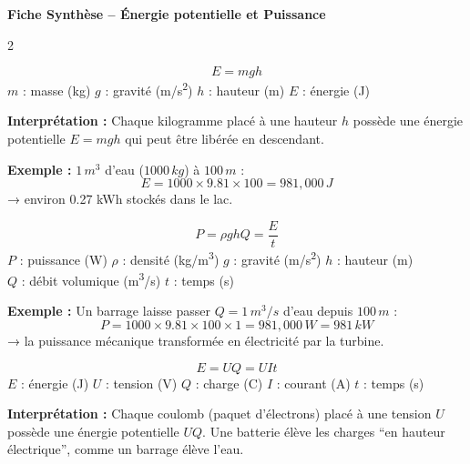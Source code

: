 \documentclass[a4paper,10pt,landscape]{article}
\begin{document}
\begin{center}
{\LARGE \textbf{Fiche Synthèse -- Énergie potentielle et Puissance}}\\[4pt]
\end{center}

\begin{multicols}{2}


\begin{tcolorbox}[cheatbox,title={\color{mechblue}Énergie potentielle gravitationnelle}]
\[
E = m g h
\]
$m$ : masse (\si{kg}) \quad
$g$ : gravité (\si{m/s^2}) \quad
$h$ : hauteur (\si{m}) \quad
$E$ : énergie (\si{J})

\textbf{Interprétation :}  
Chaque kilogramme placé à une hauteur $h$ possède une énergie potentielle $E=mgh$ qui peut être libérée en descendant.

\textbf{Exemple :}  
$1\,\si{m^3}$ d’eau ($1000\,\si{kg}$) à $100\,\si{m}$ :  
\[
E = 1000 \times 9.81 \times 100 = 981{,}000\,\si{J}
\]
→ environ 0.27 kWh stockés dans le lac.
\end{tcolorbox}


\begin{tcolorbox}[cheatbox,title={\color{mechblue}Puissance hydraulique}]
\[
P = \rho g h Q = \frac{E}{t}
\]
$P$ : puissance (\si{W}) \quad
$\rho$ : densité (\si{kg/m^3}) \quad
$g$ : gravité (\si{m/s^2}) \quad
$h$ : hauteur (\si{m}) \\
$Q$ : débit volumique (\si{m^3/s}) \quad
$t$ : temps (\si{s})

\textbf{Exemple :}  
Un barrage laisse passer $Q=1\,\si{m^3/s}$ d’eau depuis $100\,\si{m}$ :  
\[
P = 1000 \times 9.81 \times 100 \times 1 = 981{,}000\,\si{W} = 981\,\si{kW}
\]
→ la puissance mécanique transformée en électricité par la turbine.
\end{tcolorbox}



\begin{tcolorbox}[cheatbox,title={\color{elecred}Énergie potentielle électrique (batterie)}]
\[
E = U Q = U I t
\]
$E$ : énergie (\si{J}) \quad
$U$ : tension (\si{V}) \quad
$Q$ : charge (\si{C}) \quad
$I$ : courant (\si{A}) \quad
$t$ : temps (\si{s})

\textbf{Interprétation :}  
Chaque coulomb (paquet d’électrons) placé à une tension $U$ possède une énergie potentielle $UQ$.  
Une batterie élève les charges “en hauteur électrique”, comme un barrage élève l’eau.


\end{tcolorbox}
\end{multicols}
\end{document}
